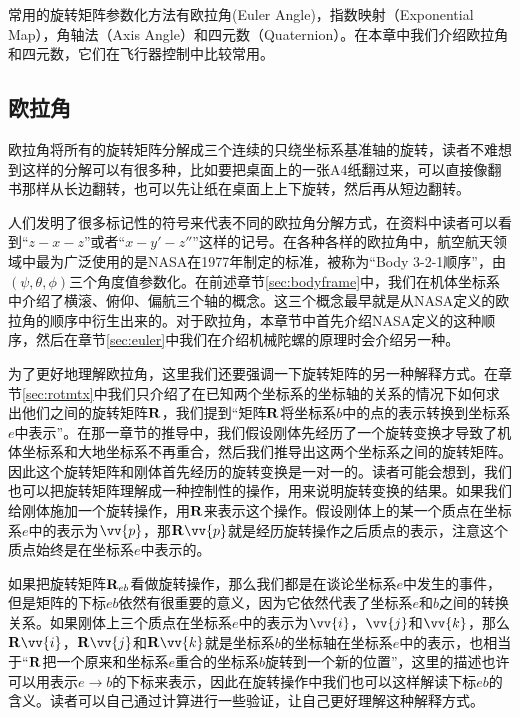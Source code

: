 \documentclass[11pt]{article}
\begin{document}
常用的旋转矩阵参数化方法有欧拉角(Euler Angle)，指数映射（Exponential Map），角轴法（Axis Angle）和四元数（Quaternion）。在本章中我们介绍欧拉角和四元数，它们在飞行器控制中比较常用。
\subsection{欧拉角}
欧拉角将所有的旋转矩阵分解成三个连续的只绕坐标系基准轴的旋转，读者不难想到这样的分解可以有很多种，比如要把桌面上的一张A4纸翻过来，可以直接像翻书那样从长边翻转，也可以先让纸在桌面上上下旋转，然后再从短边翻转。

人们发明了很多标记性的符号来代表不同的欧拉角分解方式，在资料中读者可以看到“$z-x-z$”或者“$x-y'-z''$”这样的记号。在各种各样的欧拉角中，航空航天领域中最为广泛使用的是NASA在1977年制定的标准，被称为“Body 3-2-1顺序”，由$(\psi, \theta, \phi)$三个角度值参数化\cite{nasa}。在前述章节\ref{sec:bodyframe}中，我们在机体坐标系中介绍了横滚、俯仰、偏航三个轴的概念。这三个概念最早就是从NASA定义的欧拉角的顺序中衍生出来的。对于欧拉角，本章节中首先介绍NASA定义的这种顺序，然后在章节\ref{sec:euler}中我们在介绍机械陀螺的原理时会介绍另一种。

为了更好地理解欧拉角，这里我们还要强调一下旋转矩阵的另一种解释方式。在章节\ref{sec:rotmtx}中我们只介绍了在已知两个坐标系的坐标轴的关系的情况下如何求出他们之间的旋转矩阵${\bf R}$，我们提到“矩阵${\bf R}$将坐标系$b$中的点的表示转换到坐标系$e$中表示”。在那一章节的推导中，我们假设刚体先经历了一个旋转变换才导致了机体坐标系和大地坐标系不再重合，然后我们推导出这两个坐标系之间的旋转矩阵。因此这个旋转矩阵和刚体首先经历的旋转变换是一对一的。读者可能会想到，我们也可以把旋转矩阵理解成一种控制性的操作，用来说明旋转变换的结果。如果我们给刚体施加一个旋转操作，用${\bf R}$来表示这个操作。假设刚体上的某一个质点在坐标系$e$中的表示为$\vv{p}$，那${\bf R}\vv{p}$就是经历旋转操作之后质点的表示，注意这个质点始终是在坐标系$e$中表示的。

如果把旋转矩阵${\bf R}_{eb}$看做旋转操作，那么我们都是在谈论坐标系$e$中发生的事件，但是矩阵的下标$eb$依然有很重要的意义，因为它依然代表了坐标系$e$和$b$之间的转换关系。如果刚体上三个质点在坐标系$e$中的表示为$\vv{i}$，$\vv{j}$和$\vv{k}$，那么${\bf R}\vv{i}$，${\bf R}\vv{j}$和${\bf R}\vv{k}$就是坐标系$b$的坐标轴在坐标系$e$中的表示，也相当于“${\bf R}$把一个原来和坐标系$e$重合的坐标系$b$旋转到一个新的位置”，这里的描述也许可以用表示$e\rightarrow b$的下标来表示，因此在旋转操作中我们也可以这样解读下标$eb$的含义。读者可以自己通过计算进行一些验证，让自己更好理解这种解释方式。
\end{document}
